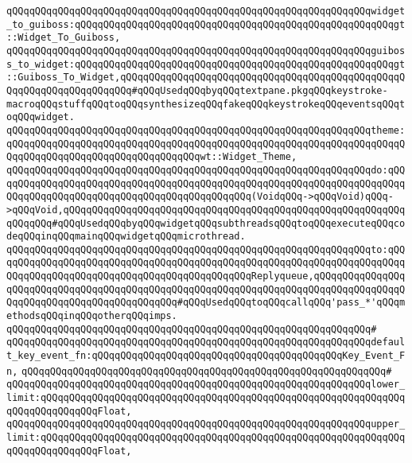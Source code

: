 \verb|qQQqqQQqqQQqqQQqqQQqqQQqqQQqqQQqqQQqqQQqqQQqqQQqqQQqqQQqqQQqqQQqwidget_to_guiboss:qQQqqQQqqQQqqQQqqQQqqQQqqQQqqQQqqQQqqQQqqQQqqQQqqQQqqQQqgt::Widget_To_Guiboss,|\newline
\verb|qQQqqQQqqQQqqQQqqQQqqQQqqQQqqQQqqQQqqQQqqQQqqQQqqQQqqQQqqQQqqQQqguiboss_to_widget:qQQqqQQqqQQqqQQqqQQqqQQqqQQqqQQqqQQqqQQqqQQqqQQqqQQqqQQqgt::Guiboss_To_Widget,qQQqqQQqqQQqqQQqqQQqqQQqqQQqqQQqqQQqqQQqqQQqqQQqqQQqqQQqqQQqqQQqqQQqqQQq#qQQqUsedqQQqbyqQQqtextpane.pkgqQQqkeystroke-macroqQQqstuffqQQqtoqQQqsynthesizeqQQqfakeqQQqkeystrokeqQQqeventsqQQqtoqQQqwidget.|\newline
\verb|qQQqqQQqqQQqqQQqqQQqqQQqqQQqqQQqqQQqqQQqqQQqqQQqqQQqqQQqqQQqqQQqtheme:qQQqqQQqqQQqqQQqqQQqqQQqqQQqqQQqqQQqqQQqqQQqqQQqqQQqqQQqqQQqqQQqqQQqqQQqqQQqqQQqqQQqqQQqqQQqqQQqqQQqqQQqwt::Widget_Theme,|\newline
\verb|qQQqqQQqqQQqqQQqqQQqqQQqqQQqqQQqqQQqqQQqqQQqqQQqqQQqqQQqqQQqqQQqdo:qQQqqQQqqQQqqQQqqQQqqQQqqQQqqQQqqQQqqQQqqQQqqQQqqQQqqQQqqQQqqQQqqQQqqQQqqQQqqQQqqQQqqQQqqQQqqQQqqQQqqQQqqQQqqQQqqQQq(VoidqQQq->qQQqVoid)qQQq->qQQqVoid,qQQqqQQqqQQqqQQqqQQqqQQqqQQqqQQqqQQqqQQqqQQqqQQqqQQqqQQqqQQqqQQqqQQq#qQQqUsedqQQqbyqQQqwidgetqQQqsubthreadsqQQqtoqQQqexecuteqQQqcodeqQQqinqQQqmainqQQqwidgetqQQqmicrothread.|\newline
\verb|qQQqqQQqqQQqqQQqqQQqqQQqqQQqqQQqqQQqqQQqqQQqqQQqqQQqqQQqqQQqqQQqto:qQQqqQQqqQQqqQQqqQQqqQQqqQQqqQQqqQQqqQQqqQQqqQQqqQQqqQQqqQQqqQQqqQQqqQQqqQQqqQQqqQQqqQQqqQQqqQQqqQQqqQQqqQQqqQQqqQQqReplyqueue,qQQqqQQqqQQqqQQqqQQqqQQqqQQqqQQqqQQqqQQqqQQqqQQqqQQqqQQqqQQqqQQqqQQqqQQqqQQqqQQqqQQqqQQqqQQqqQQqqQQqqQQqqQQqqQQqqQQq#qQQqUsedqQQqtoqQQqcallqQQq'pass_*'qQQqmethodsqQQqinqQQqotherqQQqimps.|\newline
\verb|qQQqqQQqqQQqqQQqqQQqqQQqqQQqqQQqqQQqqQQqqQQqqQQqqQQqqQQqqQQqqQQq#|\newline
\verb|qQQqqQQqqQQqqQQqqQQqqQQqqQQqqQQqqQQqqQQqqQQqqQQqqQQqqQQqqQQqqQQqdefault_key_event_fn:qQQqqQQqqQQqqQQqqQQqqQQqqQQqqQQqqQQqqQQqqQQqKey_Event_Fn,|\newline
\verb|qQQqqQQqqQQqqQQqqQQqqQQqqQQqqQQqqQQqqQQqqQQqqQQqqQQqqQQqqQQqqQQq#|\newline
\verb|qQQqqQQqqQQqqQQqqQQqqQQqqQQqqQQqqQQqqQQqqQQqqQQqqQQqqQQqqQQqqQQqlower_limit:qQQqqQQqqQQqqQQqqQQqqQQqqQQqqQQqqQQqqQQqqQQqqQQqqQQqqQQqqQQqqQQqqQQqqQQqqQQqqQQqFloat,|\newline
\verb|qQQqqQQqqQQqqQQqqQQqqQQqqQQqqQQqqQQqqQQqqQQqqQQqqQQqqQQqqQQqqQQqupper_limit:qQQqqQQqqQQqqQQqqQQqqQQqqQQqqQQqqQQqqQQqqQQqqQQqqQQqqQQqqQQqqQQqqQQqqQQqqQQqqQQqFloat,|\newline
